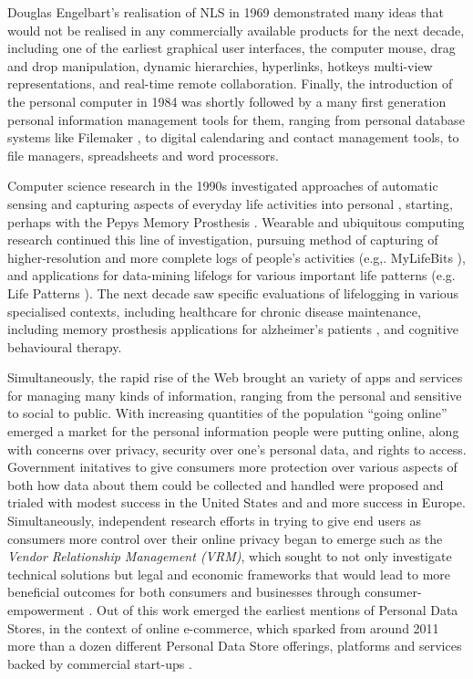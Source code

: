 \documentclass[runningheads,a4paper]{llncs}
\begin{document}
Douglas Engelbart's realisation of NLS\cite{engelartnls} in 1969 demonstrated many ideas that would not be realised in any commercially available products for the next decade, including one of the earliest graphical user interfaces, the computer mouse, drag and drop manipulation, dynamic hierarchies, hyperlinks, hotkeys multi-view representations, and real-time remote collaboration.  Finally, the introduction of the personal computer in 1984 was shortly followed by a many first generation personal information management tools for them, ranging from personal database systems like Filemaker \cite{filemaker}, to digital calendaring and contact management tools, to file managers, spreadsheets and word processors.

Computer science research in the 1990s investigated approaches of automatic sensing and capturing aspects of everyday life activities into personal \cite{lifelogs}, starting, perhaps with the Pepys Memory Prosthesis \cite{pepys}.  Wearable and ubiquitous computing research continued this line of investigation, pursuing method of capturing of higher-resolution and more complete logs of people's activities (e.g,. MyLifeBits \cite{mylifebits}), and applications for data-mining lifelogs for various important life patterns (e.g. Life Patterns \cite{clarksonphd}).  The next decade saw specific evaluations of lifelogging in various specialised contexts, including healthcare for chronic disease maintenance, including memory prosthesis applications for alzheimer's patients \cite{}, and cognitive behavioural therapy.

Simultaneously, the rapid rise of the Web brought an variety of apps and services for managing many kinds of information, ranging from the personal and sensitive to social to public.  With increasing quantities of the population ``going online'' emerged a market for the personal information people were putting online, along with concerns over privacy, security over one's personal data, and rights to access. Government initatives to give consumers more protection over various aspects of both how data about them could be collected and handled were proposed and trialed with modest success in the United States and and more success in Europe.  Simultaneously, independent research efforts in trying to give end users as consumers more control over their online privacy began to emerge such as the \emph{Vendor Relationship Management (VRM)}, which sought to not only investigate technical solutions but legal and economic frameworks that would lead to more beneficial outcomes for both consumers and businesses through consumer-empowerment \cite{vrm}.  Out of this work emerged the earliest mentions of Personal Data Stores, in the context of online e-commerce, which sparked from around 2011 more than a dozen different Personal Data Store offerings, platforms and services backed by commercial start-ups \cite{ctrlshift-report}. 
\end{document}
